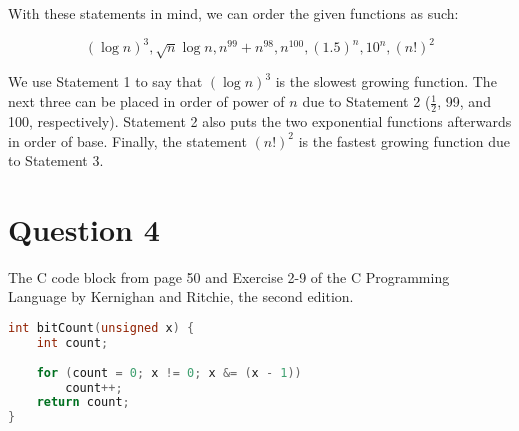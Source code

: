 \documentclass[letterpaper, 12pt]{article}
\begin{document}
With these statements in mind, we can order the given functions as such:

\[(\log{n})^3, \sqrt{n}\log{n}, n^{99} + n^{98}, n^{100}, (1.5)^n, 10^n, (n!)^2\]

We use Statement 1 to say that $(\log{n})^3$ is the slowest growing function. The next three can be placed in order of power of $n$ due to Statement 2 ($\frac{1}{2}$, 99, and 100, respectively). Statement 2 also puts the two exponential functions afterwards in order of base. Finally, the statement $(n!)^2$ is the fastest growing function due to Statement 3.

\section*{Question 4}
The C code block from page 50 and Exercise 2-9 of the C Programming Language by Kernighan and Ritchie, the second edition.

\begin{lstlisting}[language=C]
int bitCount(unsigned x) {
    int count;
    
    for (count = 0; x != 0; x &= (x - 1))
        count++;
    return count;
}
\end{lstlisting}
\end{document}
